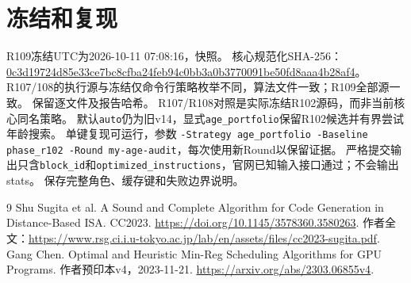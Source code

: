 \documentclass[UTF8,11pt,a4paper]{ctexart}
\begin{document}
\section{冻结和复现}
R109冻结UTC为2026-10-11 07:08:16，快照。
核心规范化SHA-256：
\url{0c3d19724d85e33ce7bc8cfba24feb94c0bb3a0b3770091be50fd8aaa4b28af4}。
R107/108的执行源与冻结仅命令行策略枚举不同，算法文件一致；R109全部源一致。
保留逐文件及报告哈希。
R107/R108对照是实际冻结R102源码，而非当前核心同名策略。
默认\texttt{auto}仍为旧v14，显式\texttt{age\_portfolio}保留R102候选并有界尝试年龄搜索。
单键复现可运行，参数
\texttt{-Strategy age\_portfolio -Baseline phase\_r102 -Round my-age-audit}，每次使用新Round以保留证据。
严格提交输出只含\texttt{block\_id}和\texttt{optimized\_instructions}，官网已知输入接口通过；不会输出stats。
保存完整角色、缓存键和失败边界说明。

\begin{thebibliography}{9}
 Shu Sugita et al. A Sound and Complete Algorithm for Code Generation in Distance-Based ISA. CC2023.
\url{https://doi.org/10.1145/3578360.3580263}.
作者全文：\url{https://www.rsg.ci.i.u-tokyo.ac.jp/lab/en/assets/files/cc2023-sugita.pdf}.
 Gang Chen. Optimal and Heuristic Min-Reg Scheduling Algorithms for GPU Programs. 作者预印本v4，2023-11-21.
\url{https://arxiv.org/abs/2303.06855v4}.
\end{thebibliography}
\end{document}
